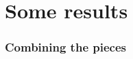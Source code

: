 \documentclass[xcolor=dvipsnames]{beamer}
\begin{document}
\section{Some results}
\begin{frame}
	\tableofcontents[currentsection]
\end{frame}

\begin{frame}
	\frametitle{Combining the pieces}


	
	

\end{frame}
\end{document}
